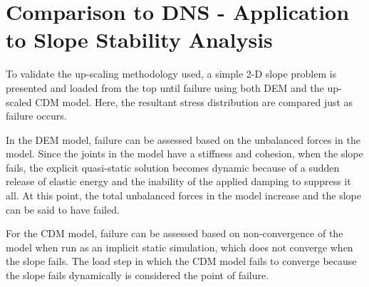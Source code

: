 \section{Comparison to DNS - Application to Slope Stability Analysis}

To validate the up-scaling methodology used, a simple 2-D slope problem is presented and loaded from the top until failure using both DEM and the up-scaled CDM model. Here, the resultant stress distribution are compared just as failure occurs. 

In the DEM model, failure can be assessed based on the unbalanced forces in the model. Since the joints in the model have a stiffness and cohesion, when the slope fails, the explicit quasi-static solution becomes dynamic because of a sudden release of elastic energy and the inability of the applied damping to suppress it all. At this point, the total unbalanced forces in the model increase and the slope can be said to have failed. 

For the CDM model, failure can be assessed based on non-convergence of the model when run as an implicit static simulation, which does not converge when the slope fails. The load step in which the CDM model fails to converge because the slope fails dynamically is considered the point of failure.
